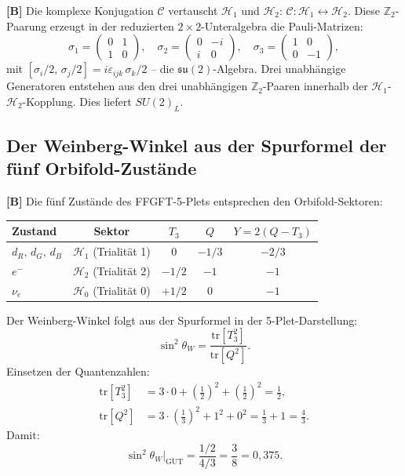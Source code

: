\textbf{[B]} Die komplexe Konjugation $\mathcal{C}$ vertauscht
$\mathcal{H}_1$ und $\mathcal{H}_2$:
$\mathcal{C}: \mathcal{H}_1 \leftrightarrow \mathcal{H}_2$.
Diese $\mathbb{Z}_2$-Paarung erzeugt in der reduzierten
$2\times 2$-Unteralgebra die Pauli-Matrizen:
\begin{equation}
  \sigma_1 = \begin{pmatrix}0&1\\1&0\end{pmatrix},\quad
  \sigma_2 = \begin{pmatrix}0&-i\\i&0\end{pmatrix},\quad
  \sigma_3 = \begin{pmatrix}1&0\\0&-1\end{pmatrix},
  \label{eq:pauli}
\end{equation}
mit $[\sigma_i/2,\,\sigma_j/2] = i\varepsilon_{ijk}\,\sigma_k/2$
-- die $\mathfrak{su}(2)$-Algebra. Drei unabhängige Generatoren
entstehen aus den drei unabhängigen $\mathbb{Z}_2$-Paaren innerhalb
der $\mathcal{H}_1$-$\mathcal{H}_2$-Kopplung. Dies liefert $SU(2)_L$.

\subsection{Der Weinberg-Winkel aus der Spurformel der fünf Orbifold-Zustände}

\textbf{[B]} Die fünf Zustände des FFGFT-5-Plets entsprechen den
Orbifold-Sektoren:

\begin{center}
\begin{tabular}{lcccc}
\toprule
Zustand & Sektor & $T_3$ & $Q$ & $Y = 2(Q-T_3)$ \\
\midrule
$d_R,\,d_G,\,d_B$ & $\mathcal{H}_1$ (Trialität 1) & $0$     & $-1/3$ & $-2/3$ \\
$e^-$             & $\mathcal{H}_2$ (Trialität 2) & $-1/2$  & $-1$   & $-1$   \\
$\nu_e$           & $\mathcal{H}_0$ (Trialität 0) & $+1/2$  & $0$    & $-1$   \\
\bottomrule
\end{tabular}
\end{center}

Der Weinberg-Winkel folgt aus der Spurformel in der 5-Plet-Darstellung:
\begin{equation}
  \sin^2\theta_W = \frac{\mathrm{tr}[T_3^2]}{\mathrm{tr}[Q^2]}.
  \label{eq:spurformel}
\end{equation}
Einsetzen der Quantenzahlen:
\begin{align}
  \mathrm{tr}[T_3^2] &= 3\cdot 0 + \left(\tfrac{1}{2}\right)^2
                       + \left(\tfrac{1}{2}\right)^2 = \tfrac{1}{2},
  \label{eq:trT3}\\
  \mathrm{tr}[Q^2]   &= 3\cdot\left(\tfrac{1}{3}\right)^2 + 1^2 + 0^2
                       = \tfrac{1}{3} + 1 = \tfrac{4}{3}.
  \label{eq:trQ2}
\end{align}
Damit:
\begin{equation}
  \boxed{\sin^2\theta_W\big|_{\mathrm{GUT}}
  = \frac{1/2}{4/3} = \frac{3}{8} = 0{,}375.}
  \label{eq:sin2gut}
\end{equation}


